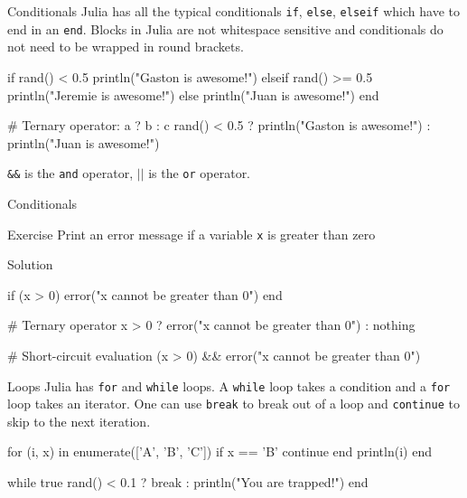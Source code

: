 \documentclass{beamer}
\newenvironment{Boxx}{\begin{tcolorbox}[standard jigsaw, opacityframe=0.8, opacityback=0.0]}{\end{tcolorbox}}
\begin{document}
\begin{frame}[fragile]{Conditionals}
  Julia has all the typical conditionals \verb|if|, \verb|else|, \verb|elseif| which have to end in an \verb|end|.
  Blocks in Julia are not whitespace sensitive and conditionals do not need to be wrapped in round brackets.
  \begin{Boxx}
  \begin{jllisting}
  if rand() < 0.5
    println("Gaston is awesome!")
  elseif rand() >= 0.5
    println("Jeremie is awesome!")
  else
    println("Juan is awesome!")
  end
  
  # Ternary operator: a ? b : c
  rand() < 0.5 ? println("Gaston  is awesome!") : println("Juan  is awesome!")
\end{jllisting}
\end{Boxx}

\verb|&&| is the \verb|and| operator, $||$ is the \verb|or| operator.
\end{frame}


\begin{frame}[fragile]{Conditionals}
	\begin{block}{Exercise}
	Print an error message if a variable \verb|x| is greater than zero
	\end{block}
	\vfill
	\begin{block}{Solution}
		\begin{jllisting}[mathescape]
  if (x > 0) error("x cannot be greater than 0") end
	
  # Ternary operator		
  x > 0 ? error("x cannot be greater than 0") : nothing
			
  # Short-circuit evaluation
  (x > 0) && error("x cannot be greater than 0")
		\end{jllisting}
	\end{block}
\end{frame}

\begin{frame}[fragile]{Loops}
  Julia has \verb|for| and \verb|while| loops. A \verb|while| loop takes a condition and a \verb|for| loop takes an iterator.
  One can use \verb|break| to break out of a loop and \verb|continue| to skip to the next iteration. %
  \begin{Boxx}
  \begin{jllisting}
  for (i, x) in enumerate(['A', 'B', 'C'])
    if x == 'B'
      continue
    end
    println(i)
  end

  while true
    rand() < 0.1 ? break : println("You are trapped!")
  end
  \end{jllisting}
\end{Boxx}
\end{frame}
\end{document}
